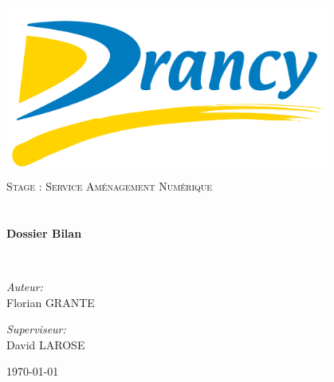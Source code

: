 \begin{titlepage}
\begin{center}

\includegraphics[width=0.8\textwidth]{./images/logo}~\\[1cm]

\textsc{\LARGE Stage : Service Aménagement Numérique}\\[1.5cm]

\textsc{\Large }\\[0.5cm]

\HRule \\[0.4cm]

{\huge \bfseries Dossier Bilan\\[0.4cm] }

\HRule \\[1.5cm]

\begin{minipage}{0.4\textwidth}
\begin{flushleft} \large
\emph{Auteur:}\\
Florian \textsc{GRANTE}\\
\end{flushleft}
\end{minipage}
\begin{minipage}{0.4\textwidth}
\begin{flushright} \large
\emph{Superviseur:} \\
David \textsc{LAROSE}
\end{flushright}
\end{minipage}

\vfill

{\large \today}

\end{center}
\end{titlepage}